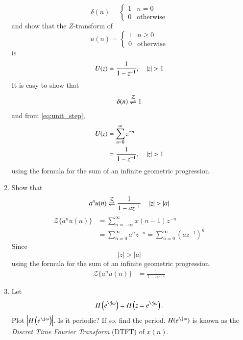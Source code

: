 \documentclass[journal,12pt,twocolumn]{IEEEtran}
\renewcommand\thesection{\arabic{section}}
\begin{document}
\begin{enumerate}[label=\thesection.\arabic*]
\begin{equation}
\delta(n)
=
\begin{cases}
1 & n = 0
\\
0 & \text{otherwise}
\end{cases}
\end{equation}
and show that the $Z$-transform of
\begin{equation}
\label{eq:unit_step}
u(n)
=
\begin{cases}
1 & n \ge 0
\\
0 & \text{otherwise}
\end{cases}
\end{equation}
is
\begin{equation}
U(z) = \frac{1}{1-z^{-1}}, \quad \left\vert z\right\vert > 1
\end{equation}
\solution It is easy to show that
\begin{equation}
\delta(n) \overset{\mathcal{Z}}{ \rightleftharpoons} 1
\end{equation}
and from \eqref{eq:unit_step},
\begin{align}
U(z) &= \sum _{n= 0}^{\infty}z^{-n}
\\
&=\frac{1}{1-z^{-1}}, \quad \left\vert z\right\vert > 1
\end{align}
using the formula for the sum of an infinite geometric progression.
%
\item Show that 
\begin{equation}
\label{eq:anun}
a^nu(n) \overset{\mathcal{Z}}{ \rightleftharpoons} \frac{1}{1-az^{-1}} \quad \left\vert z\right\vert > \left\vert a\right\vert
\end{equation}
\solution
\begin{align}
{\mathcal {Z}}\{a^nu(n)\} &=\sum _{n=-\infty }^{\infty }x(n-1)z^{-n}
\\
&=\sum _{n=0}^{\infty }a^{n}z^{-n} = \sum _{n=0 }^{\infty }(az^{-1})^{n}
\end{align}
Since 
\begin{equation}
    |z| > |a|
\end{equation}
using the formula for the sum of an infinite geometric progression.
\begin{align}
{\mathcal {Z}}\{a^nu(n)\} &= \frac{1}{1-az^{-1}}
\end{align}
%
\item 
Let
\begin{equation}
H\brak{e^{\j \omega}} = H\brak{z = e^{\j \omega}}.
\end{equation}
Plot $\abs{H\brak{e^{\j \omega}}}$.  Is it periodic? If so, find the period. $H(e^{\j \omega})$ is
known as the {\em Discret Time Fourier Transform} (DTFT) of $x(n)$.
\\

\end{enumerate}
\end{document}
